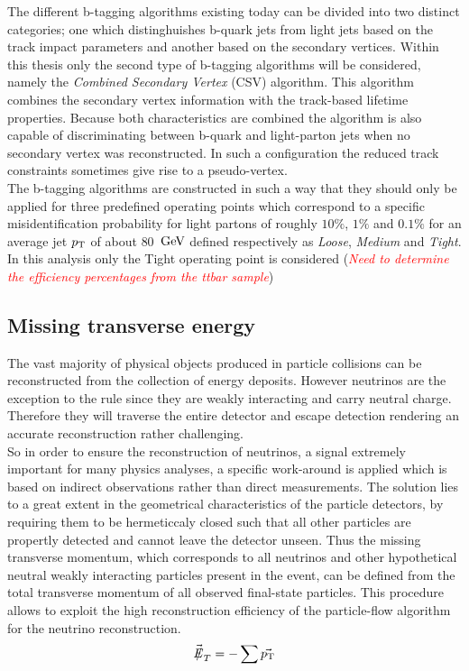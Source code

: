 The different b-tagging algorithms existing today can be divided into two distinct categories; one which distinghuishes b-quark jets from light jets based on the track impact parameters and another based on the secondary vertices. Within this thesis only the second type of b-tagging algorithms will be considered, namely the \textit{Combined Secondary Vertex} (CSV) algorithm. This algorithm combines the secondary vertex information with the track-based lifetime properties. Because both characteristics are combined the algorithm is also capable of discriminating between b-quark and light-parton jets when no secondary vertex was reconstructed. In such a configuration the reduced track constraints sometimes give rise to a pseudo-vertex.
\\
The b-tagging algorithms are constructed in such a way that they should only be applied for three predefined operating points which correspond to a specific misidentification probability for light partons of roughly $10 \%$, $1 \%$ and $0.1 \%$ for an average jet $p_{\rm T}$ of about $80$ $\, \mathrm{GeV}$ defined respectively as \textit{Loose}, \textit{Medium} and \textit{Tight}. In this analysis only the Tight operating point is considered (\textit{\textcolor{red}{Need to determine the efficiency percentages from the ttbar sample}})

\subsection{Missing transverse energy}

The vast majority of physical objects produced in particle collisions can be reconstructed from the collection of energy deposits. 
However neutrinos are the exception to the rule since they are weakly interacting and carry neutral charge. Therefore they will traverse the entire detector and escape detection rendering an accurate reconstruction rather challenging.
\\
So in order to ensure the reconstruction of neutrinos, a signal extremely important for many physics analyses, a specific work-around is applied which is based on indirect observations rather than direct measurements. The solution lies to a great extent in the geometrical characteristics of the particle detectors, by requiring them to be hermeticcaly closed such that all other particles are propertly detected and cannot leave the detector unseen.
Thus the missing transverse momentum, which corresponds to all neutrinos and other hypothetical neutral weakly interacting particles present in the event, can be defined from the total transverse momentum of all observed final-state particles. This procedure allows to exploit the high reconstruction efficiency of the particle-flow algorithm for the neutrino reconstruction.
\begin{equation}
 \vecmet = - \sum \vec{\pT}
\end{equation}
